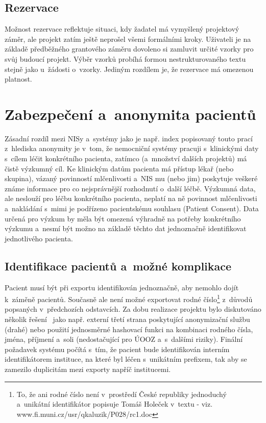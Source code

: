 \subsection{Rezervace}
Možnost rezervace reflektuje situaci, kdy žadatel má vymyšlený projektový záměr, ale projekt zatím ještě neprošel všemi formálními kroky. Uživateli je na základě předběžného grantového záměru dovoleno si zamluvit určité vzorky pro svůj budoucí projekt. Výběr vzorků probíhá formou nestrukturovaného textu stejně jako u~žádosti o~vzorky. Jediným rozdílem je, že rezervace má omezenou platnost.

\section{Zabezpečení a~anonymita pacientů}
Zásadní rozdíl mezi NISy a~systémy jako je např. index \ProjectName popisovaný touto prací z~hlediska anonymity je v~tom, že nemocniční systémy pracuji s~klinickými daty s~cílem léčit konkrétního pacienta, zatímco \ProjectName (a~množství dalších projektů) má čistě výzkumný cíl. Ke klinickým datům pacienta má přístup lékař (nebo skupina), vázaný povinností mlčenlivosti a~NIS mu (nebo jim) poskytuje veškeré známe informace pro co nejsprávnější rozhodnutí o~další léčbě. Výzkumná data, ale neslouží pro léčbu konkrétního pacienta, neplatí na ně povinnost mlčenlivosti a~nakládání s~mimi je podřízeno pacientskému souhlasu (Patient Consent).
Data určená pro výzkum by měla být omezená výhradně na potřeby konkrétního výzkumu a~nesmí být možno na základě těchto dat jednoznačně identifikovat jednotlivého pacienta.


\subsection{Identifikace pacientů a~možné komplikace}
Pacient musí být při exportu identifikován jednoznačně, aby nemohlo dojít k~záměně pacientů. Současně ale není možné exportovat rodné číslo\footnote{To, že ani rodné číslo není v~prostředí České republiky jednoduchý a~unikátní identifikátor popisuje Tomáš Holeček v~textu  - viz. www.fi.muni.cz/usr/qkaluzik/P028/rc1.doc} z~důvodů popsaných v~předchozích odstavcích. 
Za dobu realizace projektu bylo diskutováno několik řešení~\cite{ARCH_2014_1_25} jako např. externí třetí strana poskytující anonymizační službu (drahé) nebo použití jednosměrné hashovací funkci na kombinaci rodného čísla, jména, příjmení a~soli (nedostačující pro ÚOOZ a~s~dalšími riziky). Finální požadavek systému počítá s~tím, že pacient bude identifikován interním identifikátorem instituce, na které byl léčen s~unikátním prefixem, tak aby se zamezilo duplicitám mezi exporty napříč institucemi.

